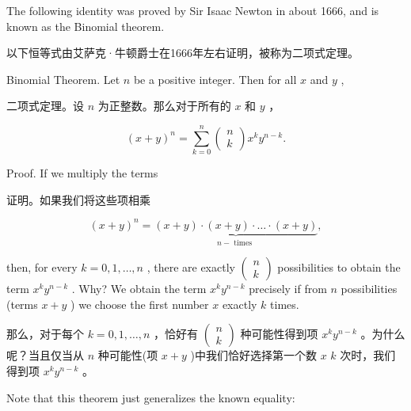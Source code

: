 \documentclass[10pt]{article}
\begin{document}
The following identity was proved by Sir Isaac Newton in about 1666, and is known as the Binomial theorem.

\begin{tcolorbox}\relax
以下恒等式由艾萨克·牛顿爵士在1666年左右证明，被称为二项式定理。
\end{tcolorbox}

Binomial Theorem. Let \(n\) be a positive integer. Then for all \(x\) and \(y\) ,

\begin{tcolorbox}\relax
二项式定理。设 \(n\) 为正整数。那么对于所有的 \(x\) 和 \(y\) ，
\end{tcolorbox}

\[
{\left( x + y\right) }^{n} = \mathop{\sum }\limits_{{k = 0}}^{n}\left( \begin{array}{l} n \\  k \end{array}\right) {x}^{k}{y}^{n - k}.
\]

Proof. If we multiply the terms

\begin{tcolorbox}\relax
证明。如果我们将这些项相乘
\end{tcolorbox}

\[
{\left( x + y\right) }^{n} = \underset{n - \text{ times }}{\underbrace{\left( {x + y}\right)  \cdot  \left( {x + y}\right)  \cdot  \ldots  \cdot  \left( {x + y}\right) }},
\]

then, for every \(k = 0,1,\ldots ,n\) , there are exactly \(\left( \begin{array}{l} n \\  k \end{array}\right)\) possibilities to obtain the term \({x}^{k}{y}^{n - k}\) . Why? We obtain the term \({x}^{k}{y}^{n - k}\) precisely if from \(n\) possibilities (terms \(x + y\) ) we choose the first number \(x\) exactly \(k\) times.

\begin{tcolorbox}\relax
那么，对于每个 \(k = 0,1,\ldots ,n\) ，恰好有 \(\left( \begin{array}{l} n \\  k \end{array}\right)\) 种可能性得到项 \({x}^{k}{y}^{n - k}\) 。为什么呢？当且仅当从 \(n\) 种可能性(项 \(x + y\) )中我们恰好选择第一个数 \(x\)  \(k\) 次时，我们得到项 \({x}^{k}{y}^{n - k}\) 。
\end{tcolorbox}

Note that this theorem just generalizes the known equality:
\end{document}
